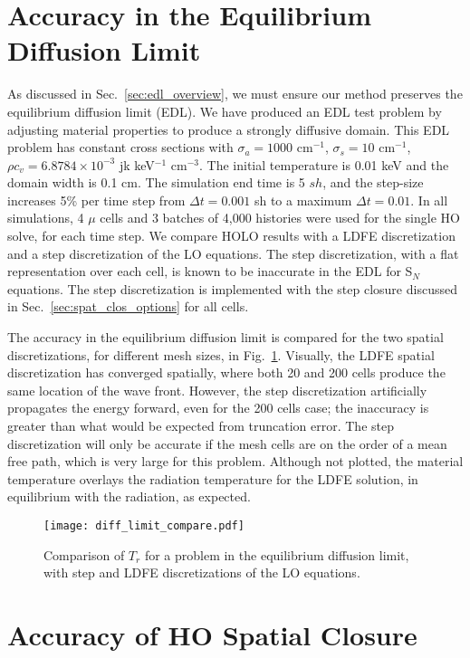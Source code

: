 \section{Accuracy in the Equilibrium Diffusion Limit}
\label{sec:edl_results}

As discussed in Sec.~\ref{sec:edl_overview}, we must ensure our method preserves the
equilibrium diffusion limit (EDL).
We have produced an EDL test problem by adjusting material properties to produce a strongly
diffusive domain. This EDL problem has constant cross sections with $\sigma_a=1000$
cm$^{-1}$, $\sigma_s=10$ cm$^{-1}$, $\rho c_v=6.8784\times 10^{-3}$ jk keV$^{-1}$
cm$^{-3}$.  The initial temperature is 0.01 keV and the domain width is 0.1 cm. The simulation
end time is 5 $sh$, and the step-size increases 5\% per time step from $\Delta t = 0.001$
sh to a maximum $\Delta t = 0.01$.
In all simulations, 4 $\mu$ cells and 3 batches of 4,000 histories were used for the
single HO solve, for each time step.
We compare HOLO results with a LDFE discretization and a step discretization of the LO
equations.  The step discretization, with a flat representation over each cell, is known
to be inaccurate in the EDL for S$_N$ equations.  The step discretization
is implemented with the step closure discussed in Sec.~\ref{sec:spat_clos_options} for all
cells.

The accuracy in the equilibrium diffusion limit is compared for the two spatial
discretizations, for different mesh sizes, in Fig.~\ref{fig:diff_limit}.  Visually, 
the LDFE spatial discretization has converged spatially, where both 20 and 200 cells
produce the same location of the wave front.  However, the step
discretization artificially propagates the energy forward, even for the 200 cells case; the inaccuracy is greater than
what would be expected from truncation error.  The step discretization will
only be accurate if the mesh cells are on the order of a mean free path, which is very large for this
problem.  Although not plotted, the material temperature overlays the radiation
temperature for the LDFE solution, in equilibrium with the radiation, as expected.
\begin{figure}[H]
    \centering
    \texttt{[image: diff\_limit\_compare.pdf]}
    \caption{\label{fig:diff_limit}Comparison of $T_r$ for a problem in the equilibrium
    diffusion limit, with step and LDFE discretizations of the LO
equations.}
\end{figure}

\section{Accuracy of HO Spatial Closure}

